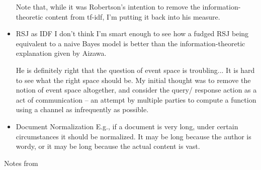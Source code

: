 \documentclass{article}
\begin{document}
\begin{itemize}
    Note that, while it was Robertson's intention to remove the information-theoretic content from tf-idf, I'm putting it back into his measure.

\item RSJ as IDF
    I don't think I'm smart enough to see how a fudged RSJ being equivalent to a naive Bayes model is better than the information-theoretic explanation given by Aizawa.

    He is definitely right that the question of event space is troubling...  It is hard to see what the right space should be.  My initial thought was to remove the notion of event space altogether, and consider the query/ response action as a act of communication -- an attempt by multiple parties to compute a function using a channel as infrequently as possible.

\item Document Normalization
    E.g., if a document is very long, under certain circumstances it should be normalized.  It may be long because the author is wordy, or it may be long because the actual content is vast.

\end{itemize}

Notes from \cite{razborov-1}
\end{document}
